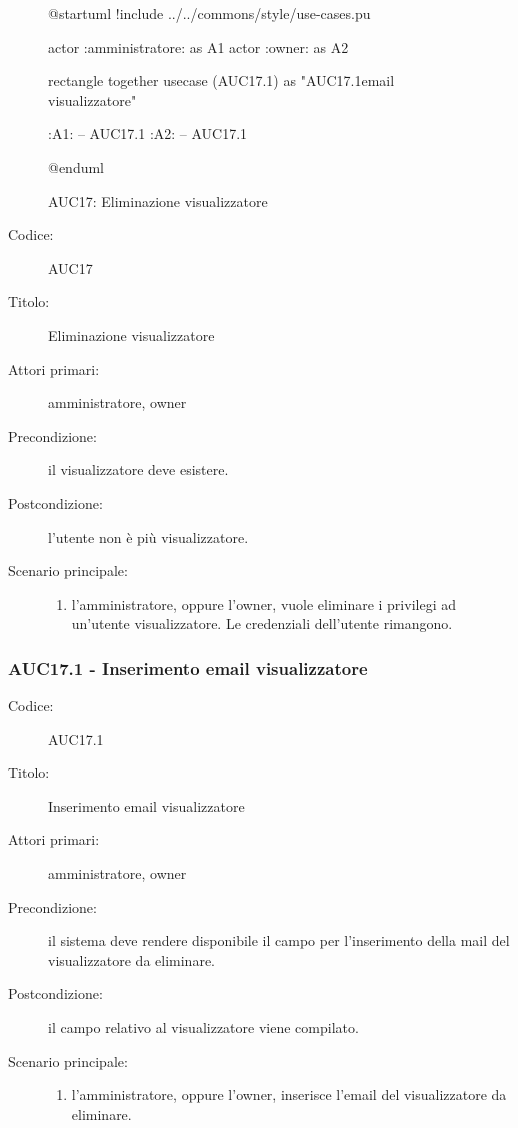 \documentclass[../../../analisi-dei-requisiti.tex]{subfiles}
\begin{document}
\begin{figure}[H]
  \centering
  \begin{plantuml}
  @startuml
  !include ../../commons/style/use-cases.pu

  actor :amministratore: as A1
  actor :owner: as A2

  rectangle {
    together {
      usecase (AUC17.1) as "AUC17.1\nInserimento email visualizzatore"
    }
  }

  :A1: -- AUC17.1
  :A2: -- AUC17.1

  @enduml
  \end{plantuml}
  \caption{AUC17: Eliminazione visualizzatore}
  \label{fig:auc17}
\end{figure}

\begin{description}
  \item[Codice:] AUC17
  \item[Titolo:] Eliminazione visualizzatore
  \item[Attori primari:] amministratore, owner
  \item[Precondizione:] il visualizzatore deve esistere.
  \item[Postcondizione:] l'utente non è più visualizzatore.
  \item[Scenario principale:]
  \begin{enumerate}
    \item l'amministratore, oppure l'owner, vuole eliminare i privilegi ad un'utente visualizzatore. Le credenziali dell'utente rimangono.
  \end{enumerate}
\end{description}

\subsubsection{AUC17.1 - Inserimento email visualizzatore}%
\label{subs:AUC17.1}
\begin{description}
  \item[Codice:] AUC17.1
  \item[Titolo:] Inserimento email visualizzatore
  \item[Attori primari:] amministratore, owner
  \item[Precondizione:] il sistema deve rendere disponibile il campo per l'inserimento della mail del visualizzatore da eliminare.
  \item[Postcondizione:] il campo relativo al visualizzatore viene compilato.
  \item[Scenario principale:]
  \begin{enumerate}
    \item l'amministratore, oppure l'owner, inserisce l'email del visualizzatore da eliminare.
  \end{enumerate}
\end{description}
\end{document}
